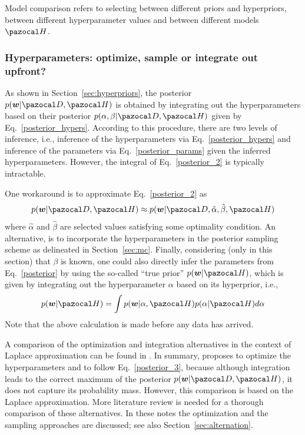 Model comparison refers to selecting between different priors and hyperpriors, between different hyperparameter values and between different models $\cH$. 

\subsubsection{Hyperparameters: optimize, sample or integrate out upfront?}

As shown in Section~\ref{sec:hyperpriors}, the posterior $p(\bw|\cD,\cH)$ is obtained by integrating out the hyperparameters based on their posterior $p(\alpha,\beta|\cD,\cH)$ given by Eq.~\eqref{posterior_hypers}. 
According to this procedure, there are two levels of inference, i.e., inference of the hyperparameters via Eq.~\eqref{posterior_hypers} and inference of the parameters via Eq.~\eqref{posterior_params} given the inferred hyperparameters. 
However, the integral of Eq.~\eqref{posterior_2} is typically intractable.

One workaround is to approximate Eq.~\eqref{posterior_2} as
\begin{equation}\label{posterior_3}
p(\bw|\cD,\cH) \approx p(\bw|\cD,\hat{\alpha},\hat{\beta},\cH) 
\end{equation}
where $\hat{\alpha}$ and $\hat{\beta}$ are selected values satisfying some optimality condition.
An alternative, is to incorporate the hyperparameters in the posterior sampling scheme as delineated in Section~\ref{sec:mc}.
Finally, considering (only in this section) that $\beta$ is known, one could also directly infer the parameters from Eq.~\eqref{posterior} by using the so-called ``true prior'' $p(\bw|\cH)$, which is given by integrating out the hyperparameter $\alpha$ based on its hyperprior, i.e., 
\begin{equation}\label{}
p(\bw|\cH) = \int p(\bw|\alpha,\cH) p(\alpha|\cH) d\alpha
\end{equation}
Note that the above calculation is made before any data has arrived. 

A comparison of the optimization and integration alternatives in the context of Laplace approximation can be found in \textcite{mackay1994hyperparameters}. 
In summary, \textcite{mackay1994hyperparameters} proposes to optimize the hyperparameters and to follow Eq.~\eqref{posterior_3}, because although integration leads to the correct maximum of the posterior $p(\bw|\cD,\cH)$, it does not capture its probability mass. 
However, this comparison is based on the Laplace approximation.
More literature review is needed for a thorough comparison of these alternatives. 
In these notes the optimization and the sampling approaches are discussed; see also Section~\ref{sec:alternation}.

